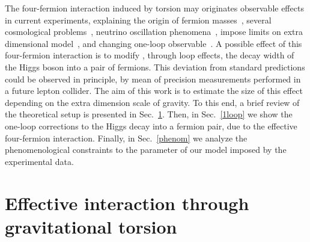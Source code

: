 \documentclass{ws-mpla}
\renewcommand{\(}{\left(}
\renewcommand{\)}{\right)}
\renewcommand{\[}{\left[}
\renewcommand{\]}{\right]}
\begin{document}


The four-fermion interaction induced by torsion may originates observable effects in current experiments,\cite{Belyaev:1997zv,Belyaev:1998ax,Belyaev:2007fn} explaining the origin of fermion masses~\cite{Castillo-Felisola:2013jva}, several cosmological problems~\cite{Puetzfeld:2004yg,Capozziello:2009mq,Poplawski:2010jv,Poplawski:2010kb,Poplawski:2011xf,Poplawski:2011wj,Fabbri:2012yg,Vignolo:2014wva}, neutrino oscillation phenomena~\cite{Capozziello:2013dja}, impose limits on extra dimensional model~\cite{Chang:2000yw,Lebedev:2002dp,CCSZ,Castillo-Felisola:2014iia}, and changing one-loop observable~\cite{Lebedev:2002dp,Castillo-Felisola:2014xba}. A possible  effect of this four-fermion interaction is to modify , through loop effects, the decay width of the Higgs boson into a pair of fermions. This deviation from standard predictions could be observed in principle, by mean of precision measurements performed in a future lepton collider. The  aim of this work is to estimate the size of this effect depending on the extra dimension scale of gravity. To this end, a brief review of the theoretical setup is presented in Sec.~\ref{CEG}. Then, in Sec.~\ref{1loop} we show the one-loop corrections to the Higgs decay into a fermion pair, due to the effective four-fermion interaction. Finally, in Sec.~\ref{phenom} we analyze the phenomenological constraints to the parameter of our model imposed by the experimental data.



\section{Effective interaction through gravitational torsion}\label{CEG}
\end{document}
